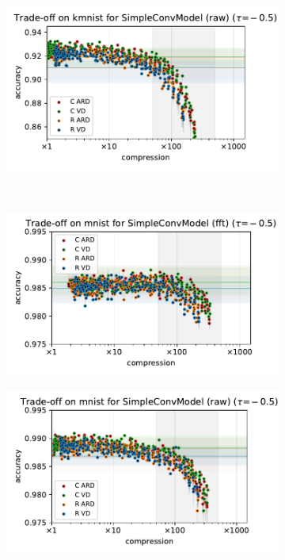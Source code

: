 \documentclass[a4paper,10pt,onecolumn]{article}
\begin{document}
\begin{figure}[b]
\begin{subfigure}[b]{0.5\columnwidth}
  \end{subfigure}%
  \begin{subfigure}[b]{0.5\columnwidth}
    \centering
    \includegraphics[width=\columnwidth]{figure__mnist-like__method_comparison/appendix__SimpleConvModel__kmnist__raw__-0.5.pdf}
  \end{subfigure} \\ %
  \begin{subfigure}[b]{0.5\columnwidth}
    \centering
    \includegraphics[width=\columnwidth]{figure__mnist-like__method_comparison/appendix__SimpleConvModel__mnist__fft__-0.5.pdf}
  \end{subfigure}%
  \begin{subfigure}[b]{0.5\columnwidth}
    \centering
    \includegraphics[width=\columnwidth]{figure__mnist-like__method_comparison/appendix__SimpleConvModel__mnist__raw__-0.5.pdf}

\end{subfigure}
\end{figure}
\end{document}
